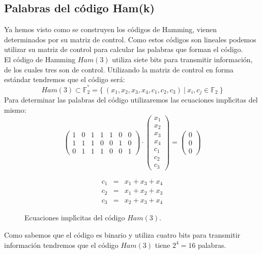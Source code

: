 \subsection{Palabras del c\'odigo Ham(k)}

Ya hemos visto como se construyen los c\'odigos de Hamming, vienen determinados
por su matriz de control. Como estos c\'odigos son lineales podemos utilizar su
matriz de control para calcular las palabras que forman el c\'odigo.\\

El c\'odigo de Hamming $Ham(3)$ utiliza siete bits para transmitir
informaci\'on, de los cuales tres son de control. Utilizando la matriz de
control en forma est\'andar tendremos que el c\'odigo ser\'a:
\begin{displaymath}
Ham(3)\subset \mathbb{F}^{^7}_2 =
\{\ (x_1,x_2,x_3,x_4,c_1,c_2,c_3)\ |\ x_i,c_j \in \mathbb{F}_2 \ \}
\end{displaymath}
Para determinar las palabras del c\'odigo utilizaremos las ecuaciones
impl\'{\i}citas del mismo:
\begin{displaymath}
\left( \begin{array}{ccccccc}
1&0&1&1&1&0&0\\
1&1&1&0&0&1&0\\
0&1&1&1&0&0&1
\end{array} \right) \cdot
\left( \begin{array}{c}
x_1\\
x_2\\
x_3\\
x_4\\
c_1\\
c_2\\
c_3
\end{array} \right) =
\left( \begin{array}{c}
0\\
0\\
0
\end{array} \right)
\end{displaymath}
%
%
\begin{figure}[!h]
\begin{eqnarray*}
c_1&=&x_1+x_3+x_4\\
c_2&=&x_1+x_2+x_3\\
c_3&=&x_2+x_3+x_4
\end{eqnarray*}
\caption{Ecuaciones impl\'{\i}citas del c\'odigo $Ham(3)$.}\label{fig:ImpHamm3}
\end{figure}
Como sabemos que el c\'odigo es binario y utiliza cuatro bits para transmitir
informaci\'on tendremos que el c\'odigo $Ham(3)$ tiene $2^4=16$ palabras.\\

